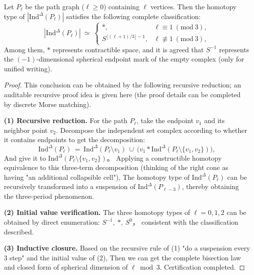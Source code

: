 \begin{lemma}\label{lem:pom-independence-complex-path}
Let \(P_{\ell}\) be the path graph (\(\ell\ge 0\)) containing \(\ell\) vertices.
Then the homotopy type of \(|\mathrm{Ind}^{\Delta}(P_{\ell})|\) satisfies the following complete classification:
\[
|\mathrm{Ind}^{\Delta}(P_{\ell})|
\ \simeq\
\begin{cases}
\ast, & \ell\equiv 1\ (\mathrm{mod}\ 3),\\[2pt]
S^{\lfloor(\ell+1)/3\rfloor-1}, & \ell\not\equiv 1\ (\mathrm{mod}\ 3),
\end{cases}
\]
Among them, \(\ast\) represents contractible space, and it is agreed that \(S^{-1}\) represents the \((-1)\)-dimensional spherical endpoint mark of the empty complex (only for unified writing).
\end{lemma}

\begin{proof}
This conclusion can be obtained by the following recursive reduction; an auditable recursive proof idea is given here (the proof details can be completed by discrete Morse matching).
\par
\textbf{(1) Recursive reduction. }
For the path \(P_{\ell}\), take the endpoint \(v_1\) and its neighbor point \(v_2\). Decompose the independent set complex according to whether it contains endpoints to get the decomposition:
\[
\mathrm{Ind}^{\Delta}(P_{\ell})
\ =\
\mathrm{Ind}^{\Delta}(P_{\ell}\setminus v_1)\ \cup\
\bigl(v_1\ast \mathrm{Ind}^{\Delta}(P_{\ell}\setminus\{v_1,v_2\})\bigr),
\]
And give it to
\(
\mathrm{Ind}^{\Delta}(P_{\ell}\setminus\{v_1,v_2\})
\)。
Applying a constructible homotopy equivalence to this three-term decomposition (thinking of the right cone as having "an additional collapsible cell"),
The homotopy type of \(\mathrm{Ind}^{\Delta}(P_{\ell})\) can be recursively transformed into a suspension of \(\mathrm{Ind}^{\Delta}(P_{\ell-3})\), thereby obtaining the three-period phenomenon.
\par
\textbf{(2) Initial value verification. }
The three homotopy types of \(\ell=0,1,2\) can be obtained by direct enumeration:
\(
S^{-1},\ \ast,\ S^{0}
\)，
consistent with the classification described.
\par
\textbf{(3) Inductive closure. }
Based on the recursive rule of (1) "do a suspension every \(3\) step" and the initial value of (2),
Then we can get the complete bisection law and closed form of spherical dimension of \(\ell\bmod 3\).
Certification completed.
\end{proof}

